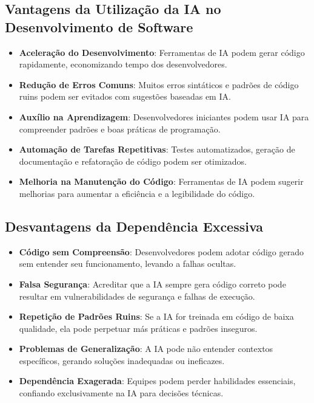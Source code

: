 \documentclass[12pt]{article}
\begin{document}
\subsection{Vantagens da Utilização da IA no Desenvolvimento de Software}

\begin{itemize}
    \item \textbf{Aceleração do Desenvolvimento}: Ferramentas de IA podem gerar código rapidamente, economizando tempo dos desenvolvedores.
    \item \textbf{Redução de Erros Comuns}: Muitos erros sintáticos e padrões de código ruins podem ser evitados com sugestões baseadas em IA.
    \item \textbf{Auxílio na Aprendizagem}: Desenvolvedores iniciantes podem usar IA para compreender padrões e boas práticas de programação.
    \item \textbf{Automação de Tarefas Repetitivas}: Testes automatizados, geração de documentação e refatoração de código podem ser otimizados.
    \item \textbf{Melhoria na Manutenção do Código}: Ferramentas de IA podem sugerir melhorias para aumentar a eficiência e a legibilidade do código.
\end{itemize}

\subsection{Desvantagens da Dependência Excessiva}

\begin{itemize}
    \item \textbf{Código sem Compreensão}: Desenvolvedores podem adotar código gerado sem entender seu funcionamento, levando a falhas ocultas.
    \item \textbf{Falsa Segurança}: Acreditar que a IA sempre gera código correto pode resultar em vulnerabilidades de segurança e falhas de execução.
    \item \textbf{Repetição de Padrões Ruins}: Se a IA for treinada em código de baixa qualidade, ela pode perpetuar más práticas e padrões inseguros.
    \item \textbf{Problemas de Generalização}: A IA pode não entender contextos específicos, gerando soluções inadequadas ou ineficazes.
    \item \textbf{Dependência Exagerada}: Equipes podem perder habilidades essenciais, confiando exclusivamente na IA para decisões técnicas.
\end{itemize}
\end{document}
